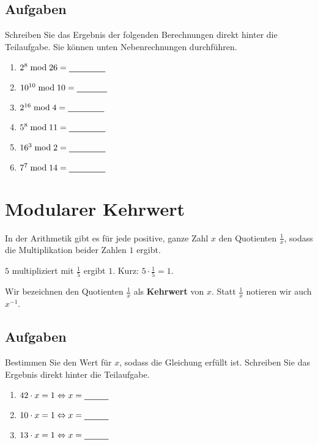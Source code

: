 \subsection{Aufgaben}

Schreiben Sie das Ergebnis der folgenden Berechnungen direkt hinter die Teilaufgabe. Sie können unten Nebenrechnungen durchführen.

\begin{multicols}{3}
\begin{enumerate}
\item $2^8 \bmod 26 = \rule[-0.75mm]{1.5cm}{.5pt}$
\item $10^{10} \bmod 10 = \rule[-0.75mm]{1.25cm}{.5pt}$
\item $2^{16} \bmod 4 = \rule[-0.75mm]{1.5cm}{.5pt}$
\item $5^{8} \bmod 11 = \rule[-0.75mm]{1.5cm}{.5pt}$
\item $16^{3} \bmod 2 = \rule[-0.75mm]{1.5cm}{.5pt}$
\item $7^{7} \bmod 14 = \rule[-0.75mm]{1.5cm}{.5pt}$
\end{enumerate}
\end{multicols}

\fillwithgrid	{1in}

\section{Modularer Kehrwert}

In der Arithmetik gibt es für jede positive, ganze Zahl $x$ den Quotienten $\frac{1}{x}$, sodass die Multiplikation beider Zahlen $1$ ergibt.

\begin{example}
	$5$ multipliziert mit $\frac{1}{5}$ ergibt $1$. Kurz: $5 \cdot \frac{1}{5} = 1$. 
\end{example}

Wir bezeichnen den Quotienten $\frac{1}{x}$ als \textbf{Kehrwert} von $x$. Statt $\frac{1}{x}$ notieren wir auch $x^{-1}$.\\

\subsection{Aufgaben}

Bestimmen Sie den Wert für $x$, sodass die Gleichung erfüllt ist. Schreiben Sie das Ergebnis direkt hinter die Teilaufgabe.

\begin{multicols}{3}
\begin{enumerate}
\item $42 \cdot x = 1 \Leftrightarrow x = \rule[-0.75mm]{1cm}{.5pt}$
\item $10 \cdot x = 1 \Leftrightarrow x = \rule[-0.75mm]{1cm}{.5pt}$
\item $13 \cdot x = 1 \Leftrightarrow x = \rule[-0.75mm]{1cm}{.5pt}$
\end{enumerate}
\end{multicols}


